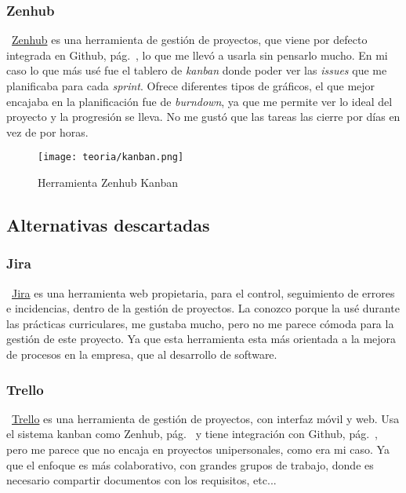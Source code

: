 \subsubsection{Zenhub}\label{zenhub}
~\href{https://bitbucket.org/product//}{Zenhub} es una herramienta de gestión de proyectos, que viene por defecto integrada en Github, pág.~\pageref{github}, lo que me llevó a usarla sin pensarlo mucho. En mi caso lo que más usé fue el tablero de \emph{kanban} donde poder ver las \emph{issues} que me planificaba para cada \emph{sprint}. Ofrece diferentes tipos de gráficos, el que mejor encajaba en la planificación fue de \emph{burndown}, ya que me permite ver lo ideal del proyecto y la progresión se lleva. No me gustó que las tareas las cierre por días en vez de por horas.

\begin{figure}[h]
	\centering
	\texttt{[image: teoria/kanban.png]}
	\caption{Herramienta Zenhub Kanban}\label{fig:zenhub}
\end{figure}

\subsection{Alternativas descartadas}

\subsubsection{Jira}
~\href{https://www.atlassian.com/es/software/jira}{Jira} es una herramienta web propietaria, para el control, seguimiento de errores e incidencias, dentro de la gestión de proyectos. La conozco porque la usé durante las prácticas curriculares, me gustaba mucho, pero no me parece cómoda para la gestión de este proyecto. Ya que esta herramienta esta más orientada a la mejora de procesos en la empresa, que al desarrollo de software.

\subsubsection{Trello}
~\href{https://trello.com/es}{Trello} es una herramienta de gestión de proyectos, con interfaz móvil y web. Usa el sistema kanban como Zenhub, pág.~\pageref{zenhub} y tiene integración con Github, pág.~\pageref{github}, pero me parece que no encaja en proyectos unipersonales, como era mi caso. Ya que el enfoque es más colaborativo, con grandes grupos de trabajo, donde es necesario compartir documentos con los requisitos, etc...

